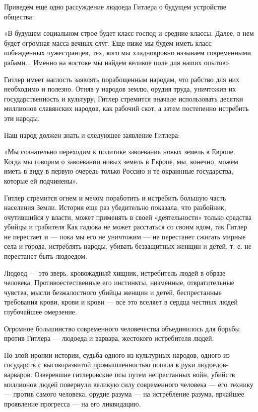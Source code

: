 \documentclass[12pt, a4paper, openany]{book}
\begin{document}
Приведем еще одно рассуждение людоеда Гитлера о будущем устройстве общества:

«В будущем социальном строе будет класс господ и средние классы. Далее, в нем будет огромная масса вечных слуг. Еще ниже мы будем иметь класс побежденных чужестранцев, тех, кого мы хладнокровно называем современными рабами... Именно на востоке мы найдем великое поле для наших опытов».

Гитлер имеет наглость заявлять порабощенным народам, что рабство для них необходимо и полезно. Отняв у народов землю, орудия труда, уничтожив их государственность и культуру, Гитлер стремится вначале использовать десятки миллионов славянских народов, как рабочий скот, а затем постепенно истребить эти народы.

Наш народ должен знать и следующее заявление Гитлера:

«Мы сознательно переходим к политике завоевания новых земель в Европе. Когда мы говорим о завоевании новых земель в Европе, мы, конечно, можем иметь в виду в первую очередь только Россию и те окраинные государства, которые ей подчинены».

Гитлер стремится огнем и мечом поработить и истребить большую часть населения Земли. История еще раз убедительно показала, что разбойник, очутившийся у власти, может применять в своей «деятельности» только средства убийцы и грабителя Как гадюка не может расстаться со своим ядом, так Гитлер не перестает и — пока мы его не уничтожим — не перестанет сжигать мирные села и города, истреблять народы, убивать беззащитных женщин и детей, т. е. не перестанет быть людоедом.

Людоед — это зверь. кровожадный хищник, истребитель людей в образе человека. Противоестественные его инстинкты, низменные, отвратительные чувства, мысли безжалостного убийцы женщин и детей, беспрестанные требования крови, крови и крови — все это вселяет в сердца честных людей глубочайшее омерзение.

Огромное большинство современного человечества объединилось для борьбы против Гитлера — людоеда и варвара, жестокого истребителя людей.

По злой иронии истории, судьба одного из культурных народов, одного из государств с высокоразвитой промышленностью попала в руки людоедов-варваров. Озверевшие гитлеровские псы путем непрестанных войн, убийств миллионов людей повернули великую силу современного человека — его технику — против самого человека, орудие разума — на истребление разума, ярчайшее проявление прогресса — на его ликвидацию.
\end{document}
